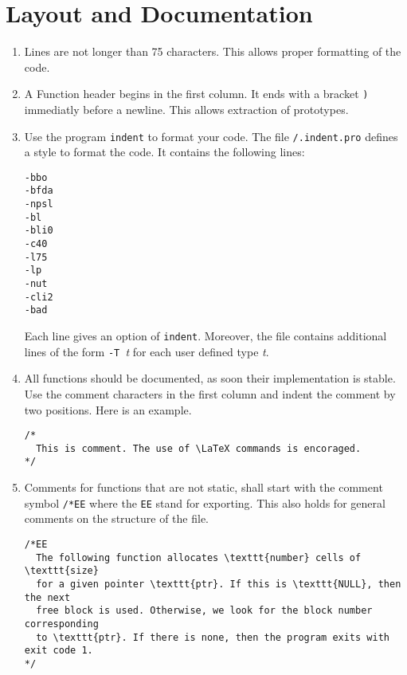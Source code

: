 \documentclass[12pt]{article}
\begin{document}
\section{Layout and Documentation}
\begin{enumerate}
\item
Lines are not longer than 75 characters. This allows proper formatting of
the code.
\item
A Function header begins in the first column. It ends with
a bracket \verb")" immediatly before a newline. This allows extraction
of prototypes.
\item
Use the program \texttt{indent} to format your code.
The file \texttt{/.indent.pro} defines a style to format the code.
It contains the following lines:
\begin{verbatim}
-bbo
-bfda
-npsl
-bl
-bli0
-c40
-l75
-lp
-nut
-cli2
-bad
\end{verbatim}
Each line gives an option of \texttt{indent}. Moreover, the file
contains additional lines of the form \texttt{-T }\emph{t} for each
user defined type \emph{t}.
\item
All functions should be documented, as soon their implementation is stable. 
Use the comment characters in the first column and indent the comment 
by two positions. Here is an example.

\begin{footnotesize}
\begin{verbatim}
/*
  This is comment. The use of \LaTeX commands is encoraged.
*/
\end{verbatim}
\end{footnotesize}
\item
Comments for functions that are not static, shall start with the comment 
symbol \verb"/*EE" where the \texttt{EE} stand for exporting. This also
holds for general comments on the structure of the file.
\begin{footnotesize}
\begin{verbatim}
/*EE
  The following function allocates \texttt{number} cells of \texttt{size}
  for a given pointer \texttt{ptr}. If this is \texttt{NULL}, then the next 
  free block is used. Otherwise, we look for the block number corresponding 
  to \texttt{ptr}. If there is none, then the program exits with exit code 1. 
*/


\end{verbatim}
\end{footnotesize}
\end{enumerate}
\end{document}
